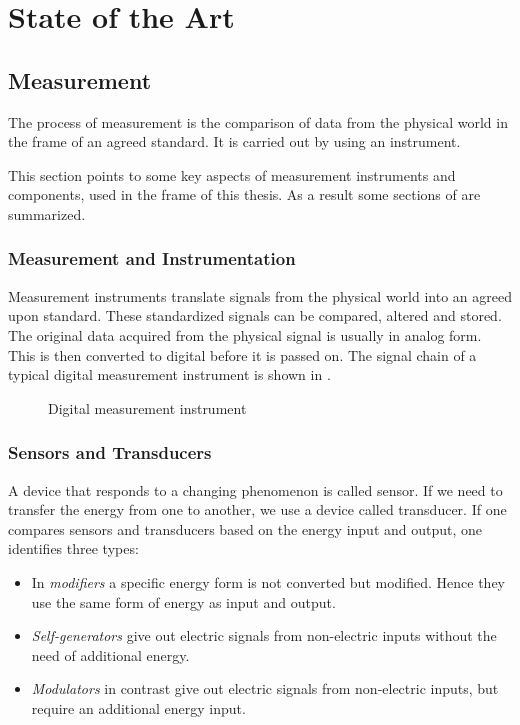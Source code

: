 \chapter{State of the Art}
\label{chap:\currfilebase}

\section{Measurement}
The process of measurement is the comparison of data from the physical world in the frame of an agreed standard. It is carried out by using an instrument.

This section points to some key aspects of measurement instruments and components, used in the frame of this thesis. As a result some sections of \cite{webster2018measurement} are summarized.

\subsection{Measurement and Instrumentation}
Measurement instruments translate signals from the physical world into an agreed upon standard. These standardized signals can be compared, altered and stored.
The original data acquired from the physical signal is usually in analog form. This is then converted to digital before it is passed on. The signal chain of a typical digital measurement instrument is shown in .

\begin{figure}[!htb]
    \centering
    
    \caption[Digital instrument]{Digital measurement instrument}
    \label{fig:digital_instrument}
\end{figure}

\subsection{Sensors and Transducers}
A device that responds to a changing phenomenon is called sensor. If we need to transfer the energy from one to another, we use a device called transducer. If one compares sensors and transducers based on the energy input and output, one identifies three types:
\begin{itemize}
    \item In \emph{modifiers} a specific energy form is not converted but modified. Hence they use the same form of energy as input and output.
    \item \emph{Self-generators} give out electric signals from non-electric inputs without the need of additional energy.
    \item \emph{Modulators} in contrast give out electric signals from non-electric inputs, but require an additional energy input.
\end{itemize}

